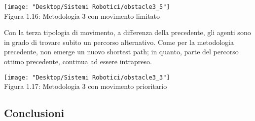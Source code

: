 \documentclass[12pt,a4paper,openright,twoside]{report}
\begin{document}
\begin{center}  
	\texttt{[image: "Desktop/Sistemi Robotici/obstacle3\_5"]}
	\\Figura 1.16: Metodologia 3 con movimento limitato
\end{center}

Con la terza tipologia di movimento, a differenza della precedente, gli agenti sono in grado di trovare subito un percorso alternativo. Come per la metodologia precedente, non emerge un nuovo shortest path; in quanto, parte del percorso ottimo precedente, continua ad essere intrapreso.\\

\begin{center}  
	\texttt{[image: "Desktop/Sistemi Robotici/obstacle3\_3"]}
	\\Figura 1.17: Metodologia 3 con movimento prioritario
\end{center}

\subsection{Conclusioni}
\end{document}

